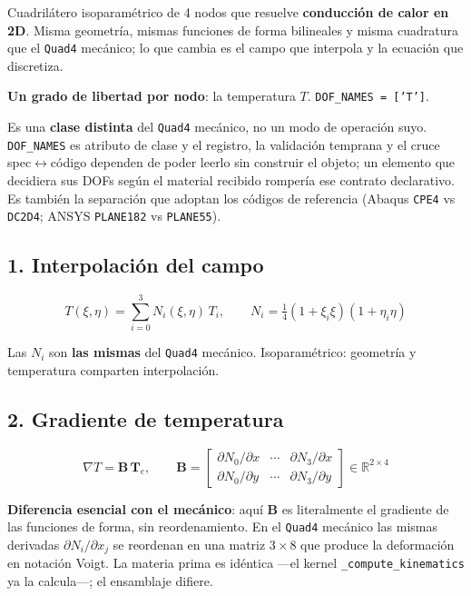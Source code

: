 \documentclass[11pt,letterpaper,oneside]{report}
\begin{document}
Cuadrilátero isoparamétrico de 4 nodos que resuelve \textbf{conducción de calor en 2D}. Misma geometría, mismas funciones de forma bilineales y misma cuadratura que el \texttt{Quad4} mecánico; lo que cambia es el campo que interpola y la ecuación que discretiza.

\textbf{Un grado de libertad por nodo}: la temperatura $T$. \texttt{DOF\_NAMES = ['T']}.

Es una \textbf{clase distinta} del \texttt{Quad4} mecánico, no un modo de operación suyo. \texttt{DOF\_NAMES} es atributo de clase y el registro, la validación temprana y el cruce spec\ensuremath{\leftrightarrow}código dependen de poder leerlo sin construir el objeto; un elemento que decidiera sus DOFs según el material recibido rompería ese contrato declarativo. Es también la separación que adoptan los códigos de referencia (Abaqus \texttt{CPE4} vs \texttt{DC2D4}; ANSYS \texttt{PLANE182} vs \texttt{PLANE55}).

\subsection{1. Interpolación del campo}

\[
T(\xi,\eta) = \sum_{i=0}^{3} N_i(\xi,\eta)\,T_i, \qquad N_i = \tfrac14(1+\xi_i\xi)(1+\eta_i\eta)
\]

Las $N_i$ son \textbf{las mismas} del \texttt{Quad4} mecánico. Isoparamétrico: geometría y temperatura comparten interpolación.

\subsection{2. Gradiente de temperatura}

\[
\nabla T = \mathbf B\,\mathbf T_e, \qquad \mathbf B = \begin{bmatrix} \partial N_0/\partial x & \cdots & \partial N_3/\partial x \\[2pt] \partial N_0/\partial y & \cdots & \partial N_3/\partial y \end{bmatrix} \in \mathbb R^{2\times 4}
\]

\textbf{Diferencia esencial con el mecánico}: aquí $\mathbf B$ es literalmente el gradiente de las funciones de forma, sin reordenamiento. En el \texttt{Quad4} mecánico las mismas derivadas $\partial N_i/\partial x_j$ se reordenan en una matriz $3\times 8$ que produce la deformación en notación Voigt. La materia prima es idéntica ---el kernel \texttt{\_compute\_kinematics} ya la calcula---; el ensamblaje difiere.
\end{document}
